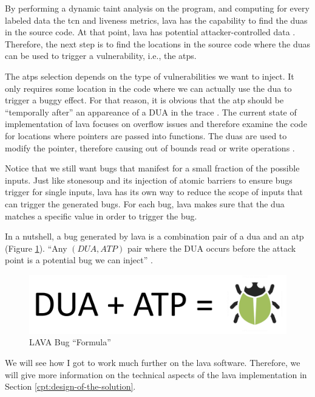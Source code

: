 By performing a dynamic taint analysis on the program, and computing for every labeled data the \gls{tcn} and liveness metrics, \gls{lava} has the capability to find the \glspl{dua} in the source code. At that point, \gls{lava} has potential attacker-controlled data . Therefore, the next step is to find the locations in the source code where the \glspl{dua} can be used to trigger a vulnerability, i.e., the \glspl{atp}.

The \glspl{atp} selection depends on the type of vulnerabilities we want to inject. It only requires some location in the code where we can actually use the \gls{dua} to trigger a buggy effect. For that reason, it is obvious that the \gls{atp} should be ``temporally after'' an appareance of a DUA in the trace \cite{dolan2016lava}. The current state of implementation of \gls{lava} focuses on overflow issues and therefore examine the code for locations where pointers are passed into functions. The \glspl{dua} are used to modify the pointer, therefore causing out of bounds read or write operations \cite{dolan2016mechanics}.

Notice that we still want bugs that manifest for a small fraction of the possible inputs. Just like \gls{stonesoup} and its injection of atomic barriers to ensure bugs trigger for single inputs, \gls{lava} has its own way to reduce the scope of inputs that can trigger the generated bugs. For each bug, \gls{lava} makes sure that the \gls{dua} matches a specific value in order to trigger the bug.

In a nutshell, a bug generated by \gls{lava} is a combination pair of a \gls{dua} and an \gls{atp} (Figure \ref{fig:lava-bug}). ``Any $(DUA,ATP)$ pair where the DUA occurs before the attack point is a potential bug we can inject'' \cite{dolan2016mechanics}.

\vspace{0.5cm}

\begin{figure}[ht]
    \centering
    \includegraphics[scale=0.35]{figures/lava-bug}
    \caption{LAVA Bug ``Formula'' \cite{dolan2016mechanics}}
    \label{fig:lava-bug}
\end{figure}

\vspace{0.5cm}

We will see how I got to work much further on the \gls{lava} software. Therefore, we will give more information on the technical aspects of the \gls{lava} implementation in Section \ref{cpt:design-of-the-solution}.